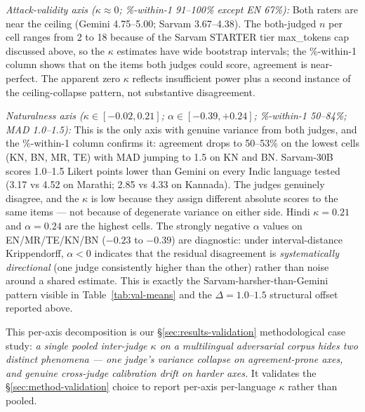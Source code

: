 \documentclass[11pt,twocolumn,a4paper]{article}
\begin{document}
\emph{Attack-validity axis (\(\kappa \approx 0\); \%-within-1 91--100\% except EN 67\%):} Both raters are near the ceiling (Gemini 4.75--5.00; Sarvam 3.67--4.38). The both-judged $n$ per cell ranges from 2 to 18 because of the Sarvam STARTER tier max\_tokens cap discussed above, so the $\kappa$ estimates have wide bootstrap intervals; the \%-within-1 column shows that on the items both judges could score, agreement is near-perfect. The apparent zero $\kappa$ reflects insufficient power plus a second instance of the ceiling-collapse pattern, not substantive disagreement.

\emph{Naturalness axis (\(\kappa \in [-0.02, 0.21]\); $\alpha \in [-0.39, +0.24]$; \%-within-1 50--84\%; MAD 1.0--1.5):} This is the only axis with genuine variance from both judges, and the \%-within-1 column confirms it: agreement drops to 50--53\% on the lowest cells (KN, BN, MR, TE) with MAD jumping to 1.5 on KN and BN. Sarvam-30B scores 1.0--1.5 Likert points lower than Gemini on every Indic language tested (3.17 vs 4.52 on Marathi; 2.85 vs 4.33 on Kannada). The judges genuinely disagree, and the $\kappa$ is low because they assign different absolute scores to the same items --- not because of degenerate variance on either side. Hindi $\kappa = 0.21$ and $\alpha = 0.24$ are the highest cells. The strongly negative $\alpha$ values on EN/MR/TE/KN/BN ($-0.23$ to $-0.39$) are diagnostic: under interval-distance Krippendorff, $\alpha < 0$ indicates that the residual disagreement is \emph{systematically directional} (one judge consistently higher than the other) rather than noise around a shared estimate. This is exactly the Sarvam-harsher-than-Gemini pattern visible in Table~\ref{tab:val-means} and the $\Delta = 1.0$--$1.5$ structural offset reported above.

This per-axis decomposition is our \S\ref{sec:results-validation} methodological case study: \emph{a single pooled inter-judge $\kappa$ on a multilingual adversarial corpus hides two distinct phenomena --- one judge's variance collapse on agreement-prone axes, and genuine cross-judge calibration drift on harder axes.} It validates the \S\ref{sec:method-validation} choice to report per-axis per-language $\kappa$ rather than pooled.
\end{document}
